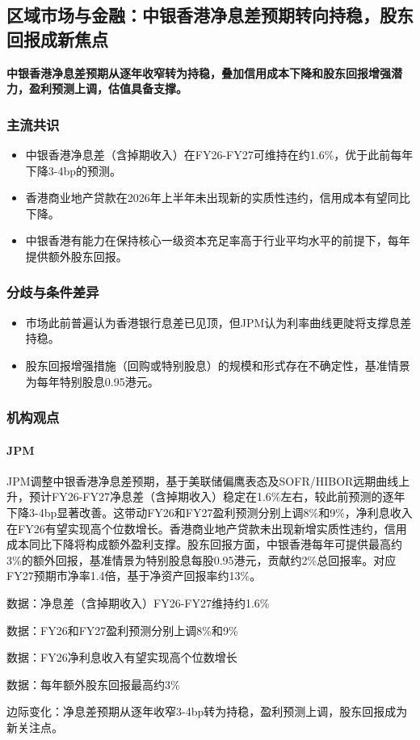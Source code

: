 \documentclass[11pt]{ctexart}
\begin{document}
\subsection{区域市场与金融：中银香港净息差预期转向持稳，股东回报成新焦点}
\textbf{中银香港净息差预期从逐年收窄转为持稳，叠加信用成本下降和股东回报增强潜力，盈利预测上调，估值具备支撑。}
\subsubsection*{主流共识}
\begin{itemize}
  \item 中银香港净息差（含掉期收入）在FY26-FY27可维持在约1.6\%，优于此前每年下降3-4bp的预测。
  \item 香港商业地产贷款在2026年上半年未出现新的实质性违约，信用成本有望同比下降。
  \item 中银香港有能力在保持核心一级资本充足率高于行业平均水平的前提下，每年提供额外股东回报。
\end{itemize}
\subsubsection*{分歧与条件差异}
\begin{itemize}
  \item 市场此前普遍认为香港银行息差已见顶，但JPM认为利率曲线更陡将支撑息差持稳。
  \item 股东回报增强措施（回购或特别股息）的规模和形式存在不确定性，基准情景为每年特别股息0.95港元。
\end{itemize}
\subsubsection*{机构观点}
\paragraph{JPM} JPM调整中银香港净息差预期，基于美联储偏鹰表态及SOFR/HIBOR远期曲线上升，预计FY26-FY27净息差（含掉期收入）稳定在1.6\%左右，较此前预测的逐年下降3-4bp显著改善。这带动FY26和FY27盈利预测分别上调8\%和9\%，净利息收入在FY26有望实现高个位数增长。香港商业地产贷款未出现新增实质性违约，信用成本同比下降将构成额外盈利支撑。股东回报方面，中银香港每年可提供最高约3\%的额外回报，基准情景为特别股息每股0.95港元，贡献约2\%总回报率。对应FY27预期市净率1.4倍，基于净资产回报率约13\%。
{\small\color{refgray}数据：净息差（含掉期收入）FY26-FY27维持约1.6\%\par}
{\small\color{refgray}数据：FY26和FY27盈利预测分别上调8\%和9\%\par}
{\small\color{refgray}数据：FY26净利息收入有望实现高个位数增长\par}
{\small\color{refgray}数据：每年额外股东回报最高约3\%\par}
{\small\color{refgray}边际变化：净息差预期从逐年收窄3-4bp转为持稳，盈利预测上调，股东回报成为新关注点。\par}
\end{document}
